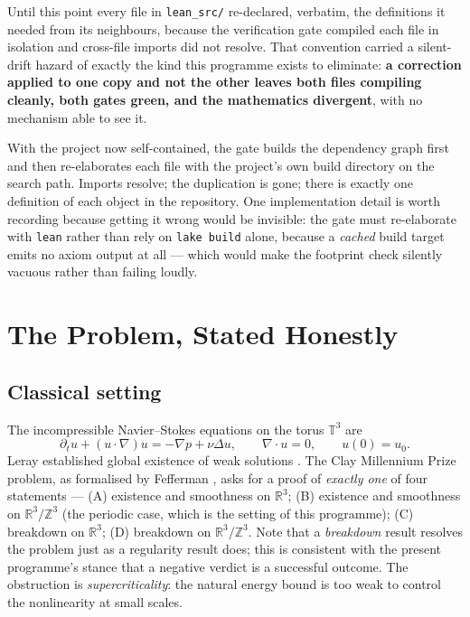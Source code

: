\documentclass[11pt,a4paper]{article}
\newcommand{\T}{\mathbb{T}}
\newcommand{\Z}{\mathbb{Z}}
\newcommand{\R}{\mathbb{R}}
\theoremstyle{definition}
\theoremstyle{plain}
\begin{document}
Until this point every file in \texttt{lean\_src/} re-declared, verbatim, the definitions it
needed from its neighbours, because the verification gate compiled each file in isolation and
cross-file imports did not resolve. That convention carried a silent-drift hazard of exactly the
kind this programme exists to eliminate: \textbf{a correction applied to one copy and not the
other leaves both files compiling cleanly, both gates green, and the mathematics divergent}, with
no mechanism able to see it.

With the project now self-contained, the gate builds the dependency graph first and then
re-elaborates each file with the project's own build directory on the search path. Imports
resolve; the duplication is gone; there is exactly one definition of each object in the
repository. One implementation detail is worth recording because getting it wrong would be
invisible: the gate must re-elaborate with \texttt{lean} rather than rely on \texttt{lake build}
alone, because a \emph{cached} build target emits no axiom output at all --- which would make the
footprint check silently vacuous rather than failing loudly.


\section{The Problem, Stated Honestly}
\label{sec:problem}

\subsection{Classical setting}

The incompressible Navier--Stokes equations on the torus $\T^3$ are
\begin{equation}
\partial_t u + (u\cdot\nabla)u = -\nabla p + \nu\Delta u,
\qquad \nabla\cdot u = 0,
\qquad u(0)=u_0 .
\label{eq:nse}
\end{equation}
Leray established global existence of weak solutions \cite{leray1934}. The Clay Millennium
Prize problem, as formalised by Fefferman \cite{fefferman-clay}, asks for a proof of
\emph{exactly one} of four statements --- (A) existence and smoothness on $\R^3$;
(B) existence and smoothness on $\R^3/\Z^3$ (the periodic case, which is the setting of this
programme); (C) breakdown on $\R^3$; (D) breakdown on $\R^3/\Z^3$. Note that a
\emph{breakdown} result resolves the problem just as a regularity result does; this is
consistent with the present programme's stance that a negative verdict is a successful
outcome. The obstruction is \emph{supercriticality}: the natural energy bound is too weak to
control the nonlinearity at small scales.
\end{document}
